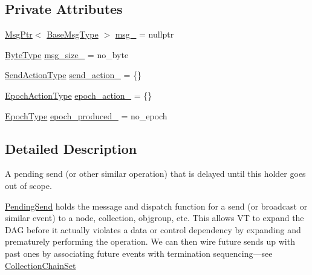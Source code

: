 \subsection*{Private Attributes}
\begin{DoxyCompactItemize}
\item 
\hyperlink{namespacevt_a9f5ebd62ee9d6dd8829e3e1cc4f858e9}{Msg\+Ptr}$<$ \hyperlink{namespacevt_a44d0d4e144748f2b19a1cfd962f50338}{Base\+Msg\+Type} $>$ \hyperlink{structvt_1_1messaging_1_1_pending_send_a6202f4243176b9189d9aef17aa108a36}{msg\+\_\+} = nullptr
\item 
\hyperlink{namespacevt_aab8d55968084610ce3b17057981e9300}{Byte\+Type} \hyperlink{structvt_1_1messaging_1_1_pending_send_a194f70cb3b0a136525a78bed573ab3be}{msg\+\_\+size\+\_\+} = no\+\_\+byte
\item 
\hyperlink{structvt_1_1messaging_1_1_pending_send_aa13248a342d68230048cde8e0756851c}{Send\+Action\+Type} \hyperlink{structvt_1_1messaging_1_1_pending_send_a0054d2fec8353438284dc02a28a73294}{send\+\_\+action\+\_\+} = \{\}
\item 
\hyperlink{structvt_1_1messaging_1_1_pending_send_a25131dc5a5e003dc65187edc97c23d1c}{Epoch\+Action\+Type} \hyperlink{structvt_1_1messaging_1_1_pending_send_a6b53bdc8c1eb674e724fd71bd1065034}{epoch\+\_\+action\+\_\+} = \{\}
\item 
\hyperlink{namespacevt_a985a5adf291c34a3ca263b3378388236}{Epoch\+Type} \hyperlink{structvt_1_1messaging_1_1_pending_send_a77a8ad56dc73c0821c3fa4cef0b4c27a}{epoch\+\_\+produced\+\_\+} = no\+\_\+epoch
\end{DoxyCompactItemize}


\subsection{Detailed Description}
A pending send (or other similar operation) that is delayed until this holder goes out of scope. 

{\ttfamily \hyperlink{structvt_1_1messaging_1_1_pending_send}{Pending\+Send}} holds the message and dispatch function for a send (or broadcast or similar event) to a node, collection, objgroup, etc. This allows VT to expand the D\+AG before it actually violates a data or control dependency by expanding and prematurely performing the operation. We can then wire future sends up with past ones by associating future events with termination sequencing---see {\ttfamily \hyperlink{classvt_1_1messaging_1_1_collection_chain_set}{Collection\+Chain\+Set}} 

